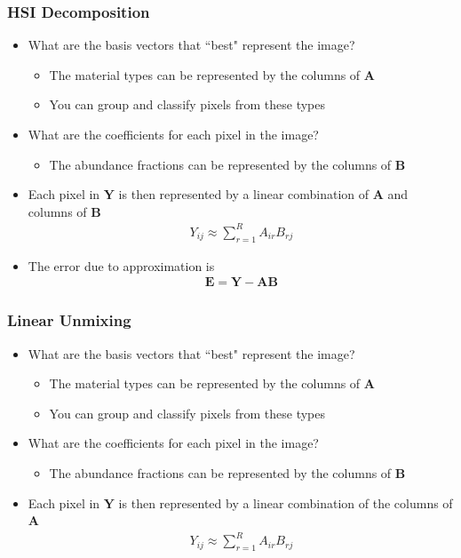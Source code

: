 \documentclass{beamer}
\begin{document}
\begin{frame}
\frametitle{HSI Decomposition}

\begin{itemize}
\item What are the basis vectors that ``best" represent the image?
\begin{itemize}
\item The material types can be represented by the columns of $\mathbf{A}$
\item You can group and classify pixels from these types
\end{itemize}
\item What are the coefficients for each pixel in the image?
\begin{itemize}
\item The abundance fractions can be represented by the columns of $\mathbf{B}$
\end{itemize}
\item Each pixel in $\mathbf{Y}$ is then represented by a linear combination of $\mathbf{A}$ and columns of $\mathbf{B}$
	\begin{align*}
    Y_{ij} \approx \sum_{r=1}^{R} A_{ir} B_{rj} 
	\end{align*}
\item The error due to approximation is 
	\begin{align*}
	\mathbf{E} = \mathbf{Y}-\mathbf{A}\mathbf{B}
	\end{align*}
\end{itemize}
\end{frame}

\begin{frame}
\frametitle{Linear Unmixing}

\begin{itemize}
\item What are the basis vectors that ``best" represent the image?
\begin{itemize}
\item The material types can be represented by the columns of $\mathbf{A}$
\item You can group and classify pixels from these types
\end{itemize}
\item What are the coefficients for each pixel in the image?
\begin{itemize}
\item The abundance fractions can be represented by the columns of $\mathbf{B}$
\end{itemize}
\item Each pixel in $\mathbf{Y}$ is then represented by a linear combination of the columns of $\mathbf{A}$
	\begin{align*}
    Y_{ij} \approx \sum_{r=1}^{R} A_{ir} B_{rj} 
	\end{align*}
\end{itemize}
\end{frame}
\end{document}
